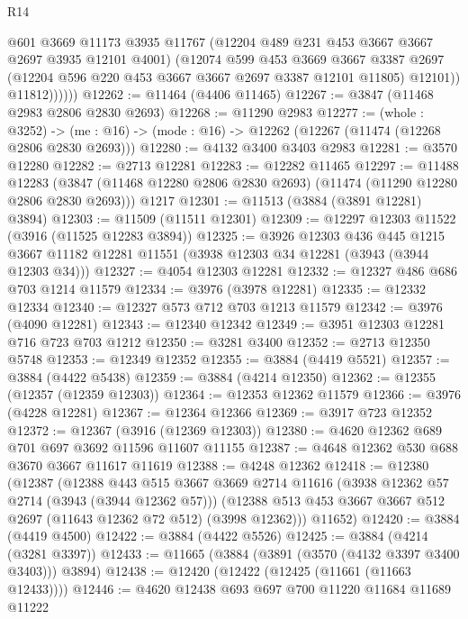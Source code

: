 \begin{lexlean}{R14}
\begin{coremodule}
                  @601
                  @3669
                  @11173
                  @3935
                  @11767
                  (@12204 @489 @231 @453 @3667 @3667 @2697 @3935 @12101 @4001)
                  (@12074
                    @599
                    @453
                    @3669
                    @3667
                    @3387
                    @2697
                    (@12204 @596 @220 @453 @3667 @3667 @2697 @3387 @12101 @11805)
                    @12101))
                @11812))))))
@12262 := @11464 (@4406 @11465)
@12267 := @3847 (@11468 @2983 @2806 @2830 @2693)
@12268 := @11290 @2983
@12277 := (whole : @3252) ->
  (me : @16) -> (mode : @16) -> @12262 (@12267 (@11474 (@12268 @2806 @2830 @2693)))
@12280 := @4132 @3400 @3403 @2983
@12281 := @3570 @12280
@12282 := @2713 @12281
@12283 := @12282 @11465
@12297 := @11488
    @12283
    (@3847 (@11468 @12280 @2806 @2830 @2693) (@11474 (@11290 @12280 @2806 @2830 @2693)))
    @1217
@12301 := @11513 (@3884 (@3891 @12281) @3894)
@12303 := @11509 (@11511 @12301)
@12309 := @12297 @12303 @11522 (@3916 (@11525 @12283 @3894))
@12325 := @3926
    @12303
    @436
    @445
    @1215
    @3667
    @11182
    @12281
    @11551
    (@3938 @12303 @34 @12281 (@3943 (@3944 @12303 @34)))
@12327 := @4054 @12303 @12281
@12332 := @12327 @486 @686 @703 @1214 @11579
@12334 := @3976 (@3978 @12281)
@12335 := @12332 @12334
@12340 := @12327 @573 @712 @703 @1213 @11579
@12342 := @3976 (@4090 @12281)
@12343 := @12340 @12342
@12349 := @3951 @12303 @12281 @716 @723 @703 @1212
@12350 := @3281 @3400
@12352 := @2713 @12350 @5748
@12353 := @12349 @12352
@12355 := @3884 (@4419 @5521)
@12357 := @3884 (@4422 @5438)
@12359 := @3884 (@4214 @12350)
@12362 := @12355 (@12357 (@12359 @12303))
@12364 := @12353 @12362 @11579
@12366 := @3976 (@4228 @12281)
@12367 := @12364 @12366
@12369 := @3917 @723 @12352
@12372 := @12367 (@3916 (@12369 @12303))
@12380 := @4620 @12362 @689 @701 @697 @3692 @11596 @11607 @11155
@12387 := @4648 @12362 @530 @688 @3670 @3667 @11617 @11619
@12388 := @4248 @12362
@12418 := @12380
    (@12387
      (@12388
        @443
        @515
        @3667
        @3669
        @2714
        @11616
        (@3938 @12362 @57 @2714 (@3943 (@3944 @12362 @57)))
        (@12388 @513 @453 @3667 @3667 @512 @2697 (@11643 @12362 @72 @512) (@3998 @12362)))
      @11652)
@12420 := @3884 (@4419 @4500)
@12422 := @3884 (@4422 @5526)
@12425 := @3884 (@4214 (@3281 @3397))
@12433 := @11665 (@3884 (@3891 (@3570 (@4132 @3397 @3400 @3403))) @3894)
@12438 := @12420 (@12422 (@12425 (@11661 (@11663 @12433))))
@12446 := @4620 @12438 @693 @697 @700 @11220 @11684 @11689 @11222

\end{coremodule}
\end{lexlean}
